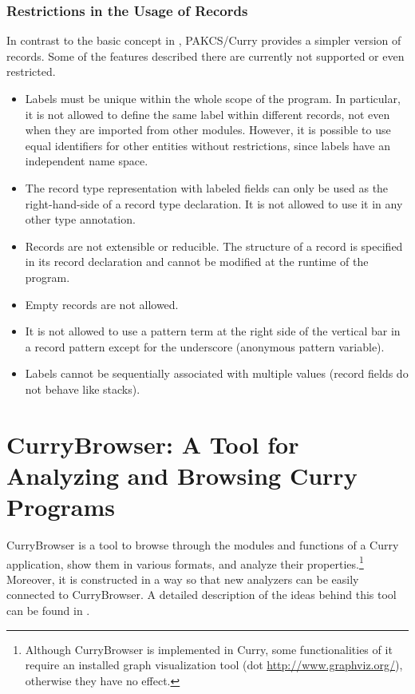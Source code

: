 \documentclass[11pt,fleqn]{article}
\newcommand{\CYS}{PAKCS\xspace} %
\newcommand{\cb}{CurryBrowser\xspace}
\begin{document}
\subsubsection{Restrictions in the Usage of Records}
\label{sec-restrinrecs}

In contrast to the basic concept in \cite{Leijen05}, \CYS/Curry provides a
simpler version of records. Some of the features described there are
currently not supported or even restricted.

\begin{itemize}
\item Labels must be unique within the whole scope of the program.
  In particular, it is not allowed to define the same label within
  different records, not even when they are imported from other
  modules. However, it is possible to use equal identifiers for other
  entities without restrictions, since labels have an independent 
  name space.
\item The record type representation with labeled fields can only be
  used as the right-hand-side of a record type declaration. It is
  not allowed to use it in any other type annotation.
\item Records are not extensible or reducible. The structure of a
  record is specified in its record declaration and cannot be
  modified at the runtime of the program.
\item Empty records are not allowed.
\item It is not allowed  to use a pattern term
  at the right side of the vertical bar in a record pattern
  except for the underscore (anonymous pattern variable).
\item Labels cannot be sequentially associated with multiple values
  (record fields do not behave like stacks).
\end{itemize}


\newpage



\newpage

\section{\cb: A Tool for Analyzing and Browsing Curry Programs}
\label{sec-currybrowser}

\cb is a tool to browse through the modules and functions
of a Curry application, show them in various formats,
and analyze their properties.\footnote{Although \cb is
implemented in Curry, some functionalities of it require an
installed graph visualization tool (dot \url{http://www.graphviz.org/}),
otherwise they have no effect.}
Moreover, it is constructed in a way so that
new analyzers can be easily connected to \cb.
A detailed description of the ideas behind this tool can be
found in \cite{Hanus05WCFLP,Hanus06WLPE}.
\end{document}

